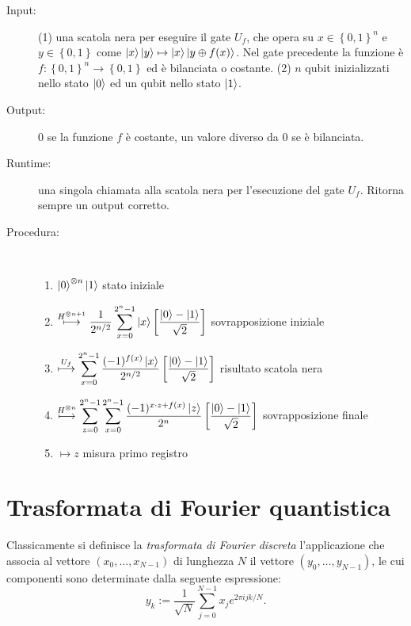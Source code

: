 \begin{algo}\*
\begin{description}
  \item [Input:] (1) una scatola nera per eseguire il gate $U_f$, che opera su $x \in \left\{0,1\right\}^n$ e $y \in \left\{0,1\right\}$ come $\ket{x}\ket{y} \mapsto \ket{x}\ket{y\oplus f(x)}$. Nel gate precedente la funzione è $f: \left\{0,1\right\}^n \to \left\{0,1\right\}$ ed è bilanciata o costante. (2) $n$ qubit inizializzati nello stato $\ket{0}$ ed un qubit nello stato $\ket{1}$.
  \item [Output:] 0 se la funzione $f$ è costante, un valore diverso da 0 se è bilanciata.
  \item [Runtime:] una singola chiamata alla scatola nera per l'esecuzione del gate $U_f$. Ritorna sempre un output corretto.
  \newpage
  \item [Procedura:] \ 
    \begin{enumerate}
     \item ${\displaystyle\ket{0}^{\otimes n}\ket{1}}$
     \hfill {\small stato iniziale}
     \item ${\displaystyle\stackrel{H^{\otimes n+1}}{\longmapsto} \frac{1}{2^{n/2}} \sum_{x=0}^{2^n-1} \ket{x}\left[\frac{\ket{0} - \ket{1}}{\sqrt{2}} \right]}$
     \hfill {\small sovrapposizione iniziale}
     \item ${\displaystyle\stackrel{U_f}{\longmapsto} \sum_{x=0}^{2^n-1} \frac{(-1)^{f(x)}\ket{x}}{2^{n/2}} \left[\frac{\ket{0} - \ket{1}}{\sqrt{2}} \right]}$
     \hfill {\small risultato scatola nera}
     \item ${\displaystyle\stackrel{H^{\otimes n}}{\longmapsto} \sum_{z=0}^{2^n-1} \sum_{x=0}^{2^n-1} \frac{(-1)^{x\cdot z + f(x)}\ket{z}}{2^n} \left[\frac{\ket{0} - \ket{1}}{\sqrt{2}} \right]}$
     \hfill {\small sovrapposizione finale}
     \item ${\displaystyle\longmapsto z}$
     \hfill {\small misura primo registro}
    \end{enumerate}
 \end{description}
\end{algo}

\section{Trasformata di Fourier quantistica} \label{sec:QFT}
Classicamente si definisce la \textit{trasformata di Fourier discreta} l'applicazione che associa al vettore $\left(x_0, \dotsc, x_{N-1}\right)$ di lunghezza $N$ il vettore $\left(y_0, \dotsc, y_{N-1}\right)$, le cui componenti sono determinate dalla seguente espressione:
\begin{equation}\label{eqn:y_k}
 y_k := \frac{1}{\sqrt{N}} \sum_{j=0}^{N-1} x_j e^{2 \pi i j k/N}.
\end{equation}

